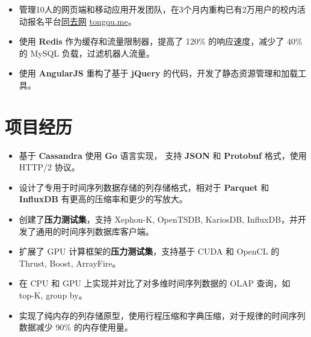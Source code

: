 \documentclass[11pt, letterpaper]{simple-cv}
\begin{document}
\begin{itemize}
  \item 管理10人的网页端和移动应用开发团队，在3个月内重构已有2万用户的校内活动报名平台\href{https://tongqu.me}{同去网} \href{https://tongqu.me}{tongqu.me}。
  \item 使用 \textbf{Redis} 作为缓存和流量限制器，提高了 120\% 的响应速度，减少了 40\% 的 MySQL 负载，过滤机器人流量。
  \item 使用 \textbf{AngularJS} 重构了基于 \textbf{jQuery} 的代码，开发了静态资源管理和加载工具。
\end{itemize}

\section{项目经历}



\begin{itemize}
  \item 基于 \textbf{Cassandra} 使用 \textbf{Go} 语言实现， 支持 \textbf{JSON} 和 \textbf{Protobuf} 格式，使用 HTTP/2 协议。
  \item 设计了专用于时间序列数据存储的列存储格式，相对于 \textbf{Parquet} 和 \textbf{InfluxDB} 有更高的压缩率和更少的写放大。
  \item 创建了\textbf{压力测试集}，支持 Xephon-K, OpenTSDB, KariosDB, InfluxDB，并开发了通用的时间序列数据库客户端。
\end{itemize}


\begin{itemize}
  \item 扩展了 GPU 计算框架的\textbf{压力测试集}，支持基于 CUDA 和 OpenCL 的 Thrust, Boost, ArrayFire。
  \item 在 CPU 和 GPU 上实现并对比了对多维时间序列数据的 OLAP 查询，如 top-K, group by。
  \item 实现了纯内存的列存储原型，使用行程压缩和字典压缩，对于规律的时间序列数据减少 90\% 的内存使用量。
\end{itemize}
\end{document}

